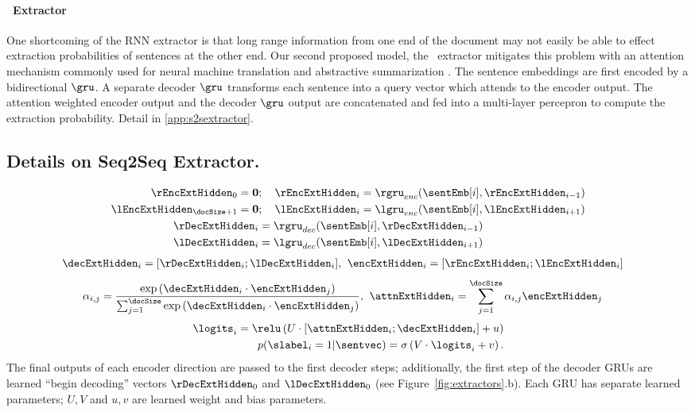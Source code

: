 \paragraph{\sts~Extractor} One shortcoming of the RNN extractor is that long range
information from one end of the document may not easily be able to effect 
extraction probabilities of sentences at the other end. 
Our second proposed model, the \sts~extractor mitigates this problem with an 
attention 
mechanism commonly
used for neural machine translation \cite{bahdanau2014neural} and 
abstractive summarization \cite{see2017get}. 
The sentence embeddings are first
encoded by a bidirectional $\gru$. A separate decoder $\gru$ transforms each 
sentence into a query vector which attends to the encoder output. The
attention weighted encoder output and the decoder $\gru$ output are concatenated
and fed into a multi-layer percepron to compute the extraction probability.
Detail in \autoref{app:s2sextractor}.
\begin{toappendix}
\section{Details on Seq2Seq Extractor.} \label{app:s2sextractor}
\begin{align}
    \rEncExtHidden_0 = \textbf{0}&;\quad \rEncExtHidden_i = \rgru_{enc}(\sentEmb[i], \rEncExtHidden_{i-1}) \\
    \lEncExtHidden_{\docSize + 1} = \textbf{0}&;\quad  \lEncExtHidden_i = \lgru_{enc}(\sentEmb[i], \lEncExtHidden_{i+1}) \\
    \rDecExtHidden_i &= \rgru_{dec}(\sentEmb[i], \rDecExtHidden_{i-1}) \\
    \lDecExtHidden_i &= \lgru_{dec}(\sentEmb[i], \lDecExtHidden_{i+1}) 
\end{align}
\begin{align}
 \decExtHidden_i = [\rDecExtHidden_i; \lDecExtHidden_i], &\;\;
 \encExtHidden_i = [\rEncExtHidden_i; \lEncExtHidden_i] 
\end{align}
\begin{align}
 \alpha_{i,j} = 
   \frac{\exp \left(\decExtHidden_i \cdot \encExtHidden_j \right)}{
   \sum_{j=1}^{\docSize}\exp\left(\decExtHidden_i \cdot \encExtHidden_j\right)}, 
& \;\; \attnExtHidden_i = \sum_{j=1}^{\docSize} \alpha_{i,j} \encExtHidden_j 
\end{align}
\begin{align}
   \logits_i = \relu\left(U \cdot [\attnExtHidden_i; \decExtHidden_i] + u \right)&\\
   p(\slabel_i=1|\sentvec) = \sigma\left(V\cdot \logits_i + v  \right).
\end{align}
The final outputs of each encoder direction are passed to the first decoder
steps; additionally, the first step of the decoder GRUs are learned 
``begin decoding'' vectors $\rDecExtHidden_0$ and $\lDecExtHidden_0$ 
(see Figure~\ref{fig:extractors}.b).
Each GRU has separate learned 
parameters; $U, V$ and $u, v$ are learned weight and bias parameters.
\end{toappendix}

